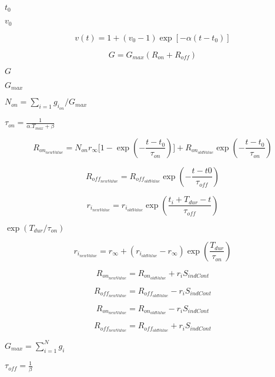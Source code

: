 \documentclass{article}
\begin{document}
$t_0$
\pagebreak

$v_0$
\pagebreak

\begin{equation} v(t) = 1 + (v_0 - 1)\exp[-\alpha(t-t_0)] \end{equation}
\pagebreak

\begin{equation} G = G_{max}(R_{on} + R_{off}) \end{equation}
\pagebreak

$G$
\pagebreak

$G_{max}$
\pagebreak

$N_{on}=\limits\sum_{i=1}g_{i_{on}}/G_{max}$
\pagebreak

$\tau_{on}=\frac{1}{\alpha.T_{max} +\beta}$
\pagebreak

\begin{equation} R_{on_{newValue}} = N_{on}r_{\infty}\Bigg[1-\exp\left(-\frac{t-t_0}{\tau_{on}}\right)\Bigg] + R_{on_{oldValue}}\exp\left(-\frac{t-t_0}{\tau_{on}}\right) \end{equation}
\pagebreak

\begin{equation} R_{off_{newValue}} = R_{off_{oldValue}}\exp\left(-\frac{t - t0}{\tau_{off}} \right) \end{equation}
\pagebreak

\begin{equation} r_{i_{newValue}} = r_{i_{oldValue}} \exp\left(\frac{t_i+T_{dur}-t}{\tau_{off}}\right) \end{equation}
\pagebreak

$\exp(T_{dur}/\tau_{on})$
\pagebreak

\begin{equation} r_{i_{newValue}} = r_{\infty} + (r_{i_{oldValue}} - r_{\infty}) \exp\left(\frac{T_{dur}}{\tau_{on}}\right) \end{equation}
\pagebreak

\begin{equation} R_{on_{newValue}} = R_{on_{oldValue}} + r_iS_{indCont} \end{equation}
\pagebreak

\begin{equation} R_{off_{newValue}} = R_{off_{oldValue}} - r_iS_{indCont} \end{equation}
\pagebreak

\begin{equation} R_{on_{newValue}} = R_{on_{oldValue}} - r_iS_{indCont} \end{equation}
\pagebreak

\begin{equation} R_{off_{newValue}} = R_{off_{oldValue}} + r_iS_{indCont} \end{equation}
\pagebreak

$G_{max} = \limits\sum_{i=1}^Ng_i$
\pagebreak

$\tau_{off}=\frac{1}{\beta}$
\pagebreak
\end{document}
